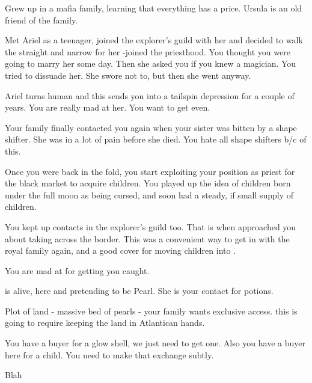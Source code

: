 \documentclass[char]{NeptuneBall}
\begin{document}
\name{\cUrchin{}}

Grew up in a mafia family, learning that everything has a price. Ursula is an old friend of the family.

Met Ariel as a teenager, joined the explorer's guild with her and decided to walk the straight and narrow for her -joined the priesthood. You thought you were going to marry her some day.  Then she asked you if you knew a magician. You tried to dissuade her. She swore not to, but then she went anyway.

Ariel turns human and this sends you into a tailspin depression for a couple of years. You are really mad at her. You want to get even.

Your family finally contacted you again when your sister was bitten by a shape shifter. She was in a lot of pain before she died. You hate all shape shifters b/c of this.

Once you were back in the fold, you start exploiting your position as priest for the black market to acquire children. You played up the idea of children born under the full moon as being cursed, and soon had a steady, if small supply of children.

You kept up contacts in the explorer's guild too. That is when \cPlant{} approached you about taking \cPrincess{} across the border. This was a convenient way to get in with the royal family again, and a good cover for moving children into \pPacifica{}.

You are mad at \cPrincess{} for getting you caught.

\cWitch{} is alive, here and pretending to be Pearl. She is your contact for potions.

Plot of land - massive bed of pearls - your family wants exclusive access. this is going to require keeping the land in Atlantican hands.

You have a buyer for a glow shell, we just need to get one. Also you have a buyer here for a child. You need to make that exchange subtly.




\begin{itemz}[Goals]
  \item Blah
\end{itemz}

\begin{contacts}
  \contact{}
\end{contacts}
\end{document}
